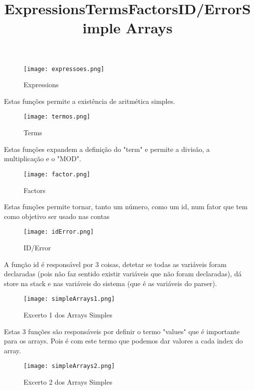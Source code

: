 \documentclass[11pt,a4paper]{report}%
\begin{document}
\title{\textbf{Expressions}}
\begin{figure}[htbp]
\centerline{\texttt{[image: expressoes.png]}}
\caption{Expressions}
\label{fig}
\end{figure}

Estas funções permite a existência de aritmética simples.

\newpage
\title{\textbf{Terms}}
\begin{figure}[htbp]
\centerline{\texttt{[image: termos.png]}}
\caption{Terms}
\label{fig}
\end{figure}

Estas funções expandem a definição do "term" e permite a divisão, a multiplicação e o "MOD".\\

\title{\textbf{Factors}}
\begin{figure}[htbp]
\centerline{\texttt{[image: factor.png]}}
\caption{Factors}
\label{fig}
\end{figure}

Estas funções permite tornar, tanto um número, como um id, num fator que tem como objetivo ser usado nas contas

\newpage

\title{\textbf{ID/Error}}
\begin{figure}[htbp]
\centerline{\texttt{[image: idError.png]}}
\caption{ID/Error}
\label{fig}
\end{figure}

A função id é responsável por 3 coisas, detetar se todas as variáveis foram declaradas (pois não faz sentido existir variáveis que não foram declaradas), dá store na stack e nas variáveis do sistema (que é as variáveis do parser).\\


\title{\textbf{Simple Arrays}}
\begin{figure}[htbp]
\centerline{\texttt{[image: simpleArrays1.png]}}
\caption{Excerto 1 dos Arrays Simples}
\label{fig}
\end{figure}

Estas 3 funções são responsáveis por definir o termo "values" que é importante para os arrays. Pois é com este termo que podemos dar valores a cada index do array.

\newpage
\begin{figure}[htbp]
\centerline{\texttt{[image: simpleArrays2.png]}}
\caption{Excerto 2 dos Arrays Simples}
\label{fig}
\end{figure}
\end{document}

